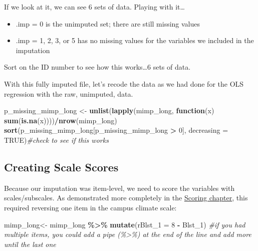 \documentclass[
  11pt,
]{book}
\newenvironment{Shaded}{\begin{snugshade}}{\end{snugshade}}
\newcommand{\AttributeTok}[1]{\textcolor[rgb]{0.27,0.27,0.27}{#1}}
\newcommand{\CommentTok}[1]{\textcolor[rgb]{0.37,0.37,0.37}{\textit{#1}}}
\newcommand{\ConstantTok}[1]{\textcolor[rgb]{0.37,0.37,0.37}{#1}}
\newcommand{\ControlFlowTok}[1]{\textcolor[rgb]{0.27,0.27,0.27}{\textbf{#1}}}
\newcommand{\DecValTok}[1]{\textcolor[rgb]{0.06,0.06,0.06}{#1}}
\newcommand{\FunctionTok}[1]{\textcolor[rgb]{0.27,0.27,0.27}{\textbf{#1}}}
\newcommand{\NormalTok}[1]{#1}
\newcommand{\OtherTok}[1]{\textcolor[rgb]{0.37,0.37,0.37}{#1}}
\newcommand{\SpecialCharTok}[1]{\textcolor[rgb]{0.43,0.43,0.43}{\textbf{#1}}}
\providecommand{\tightlist}{%
  \setlength{\itemsep}{0pt}\setlength{\parskip}{0pt}}
\begin{document}
If we look at it, we can see 6 sets of data. Playing with it\ldots{}

\begin{itemize}
\tightlist
\item
  .imp = 0 is the unimputed set; there are still missing values
\item
  .imp = 1, 2, 3, or 5 has no missing values for the variables we included in the imputation
\end{itemize}

Sort on the ID number to see how this works\ldots6 sets of data.

With this fully imputed file, let's recode the data as we had done for the OLS regression with the raw, unimputed, data.

\begin{Shaded}
\begin{Highlighting}[]
\NormalTok{p\_missing\_mimp\_long }\OtherTok{\textless{}{-}} \FunctionTok{unlist}\NormalTok{(}\FunctionTok{lapply}\NormalTok{(mimp\_long, }\ControlFlowTok{function}\NormalTok{(x) }\FunctionTok{sum}\NormalTok{(}\FunctionTok{is.na}\NormalTok{(x))))}\SpecialCharTok{/}\FunctionTok{nrow}\NormalTok{(mimp\_long)}
\FunctionTok{sort}\NormalTok{(p\_missing\_mimp\_long[p\_missing\_mimp\_long }\SpecialCharTok{\textgreater{}} \DecValTok{0}\NormalTok{], }\AttributeTok{decreasing =} \ConstantTok{TRUE}\NormalTok{)}\CommentTok{\#check to see if this works}
\end{Highlighting}
\end{Shaded}

\hypertarget{creating-scale-scores}{%
\subsection{Creating Scale Scores}\label{creating-scale-scores}}

Because our imputation was item-level, we need to score the variables with scales/subscales. As demonstrated more completely in the \protect\hyperlink{score}{Scoring chapter}, this required reversing one item in the campus climate scale:

\begin{Shaded}
\begin{Highlighting}[]
\NormalTok{mimp\_long}\OtherTok{\textless{}{-}}\NormalTok{ mimp\_long }\SpecialCharTok{\%\textgreater{}\%}
  \FunctionTok{mutate}\NormalTok{(}\AttributeTok{rBlst\_1 =} \DecValTok{8} \SpecialCharTok{{-}}\NormalTok{ Blst\_1) }\CommentTok{\#if you had multiple items, you could add a pipe (\%\textgreater{}\%) at the end of the line and add more until the last one}
\end{Highlighting}
\end{Shaded}
\end{document}
